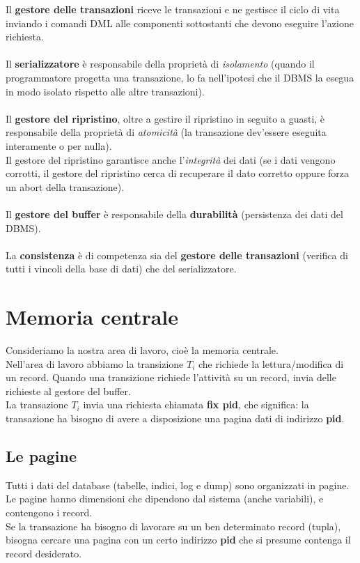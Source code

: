     
Il \textbf{gestore delle transazioni} riceve le transazioni e ne gestisce il ciclo di vita inviando i comandi DML alle componenti sottostanti che devono eseguire l'azione richiesta.\\\\
Il \textbf{serializzatore} è responsabile della proprietà di \textit{isolamento} (quando il programmatore progetta una transazione, lo fa nell'ipotesi che il DBMS la esegua in modo isolato rispetto alle altre transazioni).\\\\
Il \textbf{gestore del ripristino}, oltre a gestire il ripristino in seguito a guasti, è responsabile della proprietà di \textit{atomicità} (la transazione dev'essere eseguita interamente o per nulla).\\
Il gestore del ripristino garantisce anche l'\textit{integrità} dei dati (se i dati vengono corrotti, il gestore del ripristino cerca di recuperare il dato corretto oppure forza un abort della transazione).\\\\
Il \textbf{gestore del buffer} è responsabile della \textbf{durabilità} (persistenza dei dati del DBMS).\\\\
La \textbf{consistenza} è di competenza sia del \textbf{gestore delle transazioni} (verifica di tutti i vincoli della base di dati) che del serializzatore.

\section{Memoria centrale}
Consideriamo la nostra area di lavoro, cioè la memoria centrale.\\
Nell'area di lavoro abbiamo la transizione $T_i$ che richiede la lettura/modifica di un record. Quando una transizione richiede l'attività su un record, invia delle richieste al gestore del buffer.\\
La transazione $T_i$ invia una richiesta chiamata \textbf{fix pid}, che significa: la transazione ha bisogno di avere a disposizione una pagina dati di indirizzo \textbf{pid}.

\subsection{Le pagine}
Tutti i dati del database (tabelle, indici, log e dump) sono organizzati in pagine.\\
Le pagine hanno dimensioni che dipendono dal sistema (anche variabili), e contengono i record.\\
Se la transazione ha bisogno di lavorare su un ben determinato record (tupla), bisogna cercare una pagina con un certo indirizzo \textbf{pid} che si presume contenga il record desiderato.

